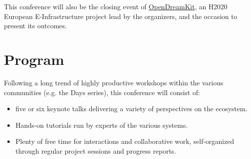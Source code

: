 \documentclass[12pt]{amsart}
\begin{document}
This conference will also be the closing event of
\href{opendreamkit.org}{OpenDreamKit}, an H2020 European
E-Infrastructure project lead by the organizers, and the occasion to
present its outcomes.


\section*{Program}

Following a long trend of highly productive workshops within the
various communities (e.g. the \Sage Days series), this conference will consist of:
\begin{itemize}
\item five or six keynote talks delivering a variety of perspectives on the
  ecosystem.
\item Hands-on tutorials run by experts of the various systems.
\item Plenty of free time for interactions and collaborative work,
  self-organized through regular project sessions and progress
  reports.
\end{itemize}
\end{document}
